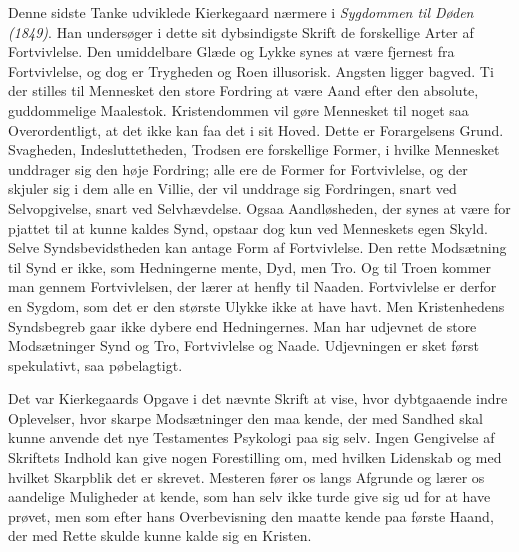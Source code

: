 \documentclass[12pt,a4paper,openany]{book}
\newcommand{\opage}[1]{\marginnote{\footnotesize\textit{[#1]}}}
\begin{document}
\setcounter{footnote}{0}%
\opage{163}Denne sidste Tanke udviklede Kierkegaard nærmere i \textit{Sygdommen
til Døden (1849)}. Han undersøger i dette sit dybsindigste Skrift de
forskellige Arter af Fortvivlelse. Den umiddelbare Glæde og Lykke synes at være
fjernest fra Fortvivlelse, og dog er Trygheden og Roen illusorisk. Angsten
ligger bagved. Ti der stilles til Mennesket den store Fordring at være Aand
efter den absolute, guddommelige Maalestok. Kristendommen vil gøre Mennesket
til noget saa Overordentligt, at det ikke kan faa det i sit Hoved. Dette er
Forargelsens Grund. Svagheden, Indesluttetheden, Trodsen ere forskellige
Former, i hvilke Mennesket unddrager sig den høje Fordring; alle ere de Former
for Fortvivlelse, og der skjuler sig i dem alle en Villie, der vil unddrage sig
Fordringen, snart ved Selvopgivelse, snart ved Selvhævdelse. Ogsaa
Aandløsheden, der synes at være for pjattet til at kunne kaldes Synd, opstaar
dog kun ved Menneskets egen Skyld. Selve Syndsbevidstheden kan antage Form af
Fortvivlelse. Den rette Modsætning til Synd er ikke, som Hedningerne mente,
Dyd, men Tro. Og til Troen kommer man gennem Fortvivlelsen, der lærer at henfly
til Naaden. Fortvivlelse er derfor en Sygdom, som det er den største Ulykke
ikke at have havt. Men Kristenhedens Syndsbegreb gaar ikke dybere end
Hedningernes. Man har udjevnet de store Modsætninger Synd og Tro, Fortvivlelse
og Naade. Udjevningen er sket først spekulativt, saa pøbelagtigt.

Det var Kierkegaards Opgave i det nævnte Skrift at vise, hvor dybtgaaende indre
Oplevelser, hvor skarpe Modsætninger den maa kende, der med Sandhed skal kunne
anvende det nye Testamentes Psykologi paa sig selv. Ingen Gengivelse af
Skriftets Indhold kan give nogen Forestilling om, med hvilken Lidenskab og med
hvilket Skarpblik det er skrevet. Mesteren fører os langs Afgrunde og lærer os
aandelige Muligheder at kende, som han selv ikke turde give sig ud for at have
prøvet, men som efter hans Overbevisning den maatte kende paa første Haand, der
med Rette skulde kunne kalde sig en Kristen.
\end{document}
